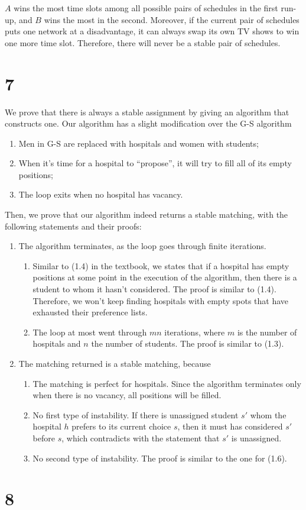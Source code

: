 \documentclass{article}
\begin{document}
$A$ wins the most time slots among all possible pairs of schedules in the first run-up, and $B$ wins the most in the second. Moreover, if the current pair of schedules puts one network at a disadvantage, it can always swap its own TV shows to win one more time slot. Therefore, there will never be a stable pair of schedules.

\section*{7}

We prove that there is always a stable assignment by giving an algorithm that constructs one. Our algorithm has a slight modification over the G-S algorithm

\begin{enumerate}
	\item Men in G-S are replaced with hospitals and women with students;
	\item When it's time for a hospital to ``propose'', it will try to fill all of its empty positions;
	\item The loop exits when no hospital has vacancy.
\end{enumerate}


Then, we prove that our algorithm indeed returns a stable matching, with the following statements and their proofs:

\begin{enumerate}
	\item The algorithm terminates, as the loop goes through finite iterations.
	\begin{enumerate}
		\item Similar to (1.4) in the textbook, we states that if a hospital has empty positions at some point in the execution of the algorithm, then there is a student to whom it hasn't considered. The proof is similar to (1.4). Therefore, we won't keep finding hospitals with empty spots that have exhausted their preference lists.
		\item The loop at most went through $mn$ iterations, where $m$ is the number of hospitals and $n$ the number of students. The proof is similar to (1.3).
	\end{enumerate}
	\item The matching returned is a stable matching, because
	\begin{enumerate}
		\item The matching is perfect for hospitals. Since the algorithm terminates only when there is no vacancy, all positions will be filled.
		\item No first type of instability. If there is unassigned student $s'$ whom the hospital $h$ prefers to its current choice $s$, then it must has considered $s'$ before $s$, which contradicts with the statement that $s'$ is unassigned.
		\item No second type of instability. The proof is similar to the one for (1.6).
	\end{enumerate}
\end{enumerate}

\section*{8}
\end{document}
